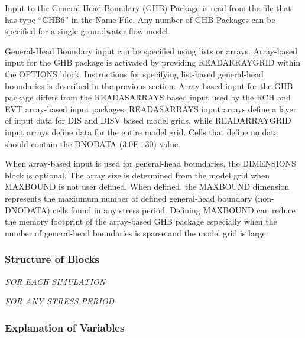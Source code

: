 Input to the General-Head Boundary (GHB) Package is read from the file that has type ``GHB6'' in the Name File.  Any number of GHB Packages can be specified for a single groundwater flow model.

General-Head Boundary input can be specified using lists or arrays.  Array-based input for the GHB package is activated by providing READARRAYGRID within the OPTIONS block.  Instructions for specifying list-based general-head boundaries is described in the previous section.  Array-based input for the GHB package differs from the READASARRAYS based input used by the RCH and EVT array-based input packages.  READASARRAYS input arrays define a layer of input data for DIS and DISV based model grids, while READARRAYGRID input arrays define data for the entire model grid.  Cells that define no data should contain the DNODATA (3.0E+30) value.

When array-based input is used for general-head boundaries, the DIMENSIONS block is optional.  The array size is determined from the model grid when MAXBOUND is not user defined.  When defined, the MAXBOUND dimension represents the maxiumum number of defined general-head boundary (non-DNODATA) cells found in any stress period.  Defining MAXBOUND can reduce the memory footprint of the array-based GHB package especially when the number of general-head boundaries is sparse and the model grid is large.

\vspace{5mm}
\subsubsection{Structure of Blocks}
\vspace{5mm}

\noindent \textit{FOR EACH SIMULATION}


\vspace{5mm}
\noindent \textit{FOR ANY STRESS PERIOD}

\packageperioddescription

\vspace{5mm}
\subsubsection{Explanation of Variables}
\begin{description}

\end{description}

